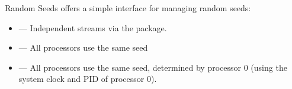 \begin{frame}
  \begin{block}{Random Seeds}\pause
   offers a simple interface for managing random seeds:
    \begin{itemize}
      \item {} --- Independent streams via the  package.
      \item {} --- All processors use the same seed 
      \item {} --- All processors use the same seed, determined by processor 0 (using the system clock and PID of processor 0).
    \end{itemize}
  \end{block}
\end{frame}



% 
% 
%   
% 
% 
% 




